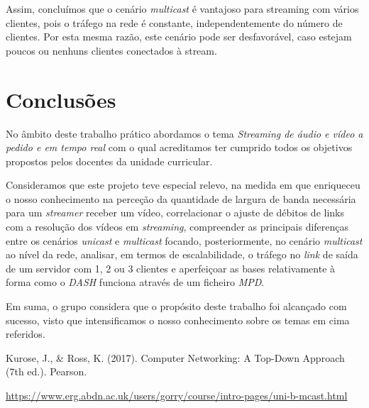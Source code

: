 \documentclass[a4paper, 11pt]{article}
\begin{document}
Assim, concluímos que o cenário \textit{multicast} é vantajoso para streaming com vários clientes, pois o tráfego na rede é constante, independentemente do número de clientes. Por esta mesma razão, este cenário pode ser desfavorável, caso estejam poucos ou nenhuns clientes conectados à stream.


\clearpage
\section {Conclusões}

No âmbito deste trabalho prático abordamos o tema \textit{Streaming de áudio e vídeo a pedido e em tempo real} com o qual acreditamos ter cumprido todos os objetivos propostos pelos docentes da unidade curricular. 

Consideramos que este projeto teve especial relevo, na medida em que enriqueceu o nosso conhecimento na perceção da quantidade de largura de banda necessária para um \textit{streamer} receber um vídeo, correlacionar o ajuste de débitos de links com a resolução dos vídeos em \textit{streaming}, compreender as principais diferenças entre os cenários \textit{unicast} e \textit{multicast} focando, posteriormente, no cenário \textit{multicast} ao nível da rede, analisar, em termos de escalabilidade, o tráfego no \textit{link} de saída de um servidor com 1, 2 ou 3 clientes e aperfeiçoar as bases relativamente à forma como o \textit{DASH} funciona através de um ficheiro \textit{MPD}.

Em suma, o grupo considera que o propósito deste trabalho foi alcançado com sucesso, visto que intensificamos o nosso conhecimento sobre os temas em cima referidos.

\clearpage
\begin{thebibliography}{}

Kurose, J., \& Ross, K. (2017). Computer Networking: A Top-Down Approach (7th ed.). Pearson.

\url{https://www.erg.abdn.ac.uk/users/gorry/course/intro-pages/uni-b-mcast.html}

\end{thebibliography}
\end{document}
